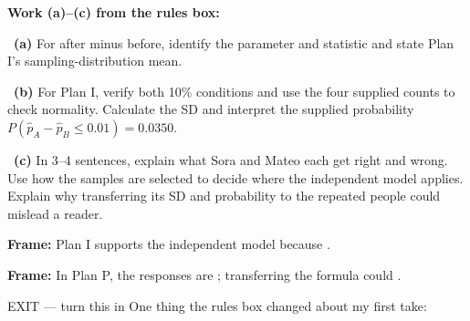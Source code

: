 \documentclass[11pt]{article}
\begin{document}
\newpage
\textbf{Work (a)--(c) from the rules box:}\par\smallskip

~\textbf{(a)} For after minus before, identify the parameter and statistic and state Plan I's sampling-distribution mean.\par
\workspace{0.8in}

~\textbf{(b)} For Plan I, verify both 10\% conditions and use the four supplied counts to check normality. Calculate the SD and interpret the supplied probability $P(\widehat p_A-\widehat p_B\leq0.01)=0.0350$.\par
\workspace{1.4in}

~\textbf{(c)} In 3--4 sentences, explain what Sora and Mateo each get right and wrong. Use how the samples are selected to decide where the independent model applies. Explain why transferring its SD and probability to the repeated people could mislead a reader.\par
\workspace{2.0in}

\begin{sentenceframebox}\raggedright\textbf{Frame:} Plan I supports the independent model because \blank[2.9in].\end{sentenceframebox}

\begin{sentenceframebox}\raggedright\textbf{Frame:} In Plan P, the responses are \blank[1.4in]; transferring the formula could \blank[2.6in].\end{sentenceframebox}

\begin{summaryexitbox}{EXIT --- turn this in}
One thing the rules box changed about my first take: \hrulefill\par
\workspace{0.4in}
\end{summaryexitbox}
\end{document}
